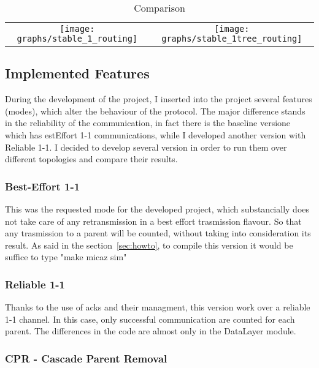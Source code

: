 \documentclass{article}
\begin{document}
		\begin{table}[H]
			\centering
			\begin{tabular}{cc}
				\texttt{[image: graphs/stable\_1\_routing]}&\texttt{[image: graphs/stable\_1tree\_routing]}\\
			\end{tabular}
			\caption{Comparison}
			\label{tab:comparisonProto}
		\end{table}

	\subsection{Implemented Features}
	
During the development of the project, I inserted into the project several features (modes), which alter the behaviour of the protocol. The major difference stands in the reliability of the communication, in fact there is the baseline versione which has estEffort 1-1 communications, while I developed another version with Reliable 1-1. I decided to develop several version in order to run them over different topologies and compare their results.

		\subsubsection{Best-Effort 1-1}
	
This was the requested mode for the developed project, which substancially does not take care of any retransmission in a best effort trasmission flavour. So that any trasmission to a parent will be counted, without taking into consideration its result. As said in the section~\ref{sec:howto}, to compile this version it would be suffice to type "make micaz sim"

		\subsubsection{Reliable 1-1}
	
Thanks to the use of acks and their managment, this version work over a reliable 1-1 channel. In this case, only successful communication are counted for each parent. The differences in the code are almost only in the DataLayer module.

		\subsubsection{CPR - Cascade Parent Removal}
	
\end{document}
